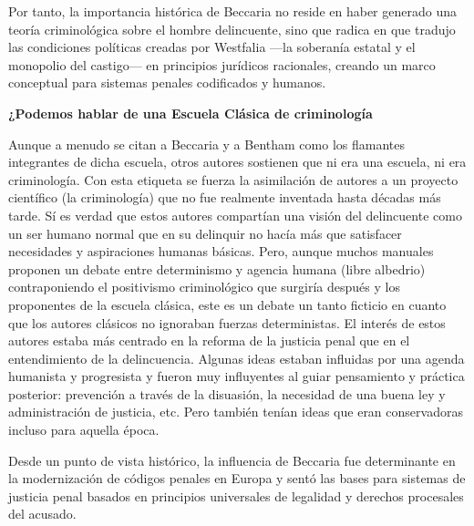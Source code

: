 \documentclass[
  spanish,
  letterpaper,
  DIV=11,
  numbers=noendperiod]{scrreprt}
\begin{document}
Por tanto, la importancia histórica de Beccaria no reside en haber
generado una teoría criminológica sobre el hombre delincuente, sino que
radica en que tradujo las condiciones políticas creadas por Westfalia
---la soberanía estatal y el monopolio del castigo--- en principios
jurídicos racionales, creando un marco conceptual para sistemas penales
codificados y humanos.

\begin{tcolorbox}[enhanced jigsaw, bottomtitle=1mm, toprule=.15mm, colbacktitle=quarto-callout-note-color!10!white, bottomrule=.15mm, leftrule=.75mm, colframe=quarto-callout-note-color-frame, opacitybacktitle=0.6, titlerule=0mm, breakable, colback=white, left=2mm, arc=.35mm, title=\textcolor{quarto-callout-note-color}{\faInfo}\hspace{0.5em}{Nota}, toptitle=1mm, coltitle=black, rightrule=.15mm, opacityback=0]

\textbf{¿Podemos hablar de una Escuela Clásica de criminología}

Aunque a menudo se citan a Beccaria y a Bentham como los flamantes
integrantes de dicha escuela, otros autores sostienen que ni era una
escuela, ni era criminología. Con esta etiqueta se fuerza la asimilación
de autores a un proyecto científico (la criminología) que no fue
realmente inventada hasta décadas más tarde. Sí es verdad que estos
autores compartían una visión del delincuente como un ser humano normal
que en su delinquir no hacía más que satisfacer necesidades y
aspiraciones humanas básicas. Pero, aunque muchos manuales proponen un
debate entre determinismo y agencia humana (libre albedrio)
contraponiendo el positivismo criminológico que surgiría después y los
proponentes de la escuela clásica, este es un debate un tanto ficticio
en cuanto que los autores clásicos no ignoraban fuerzas deterministas.
El interés de estos autores estaba más centrado en la reforma de la
justicia penal que en el entendimiento de la delincuencia. Algunas ideas
estaban influidas por una agenda humanista y progresista y fueron muy
influyentes al guiar pensamiento y práctica posterior: prevención a
través de la disuasión, la necesidad de una buena ley y administración
de justicia, etc. Pero también tenían ideas que eran conservadoras
incluso para aquella época.

\end{tcolorbox}

Desde un punto de vista histórico, la influencia de Beccaria fue
determinante en la modernización de códigos penales en Europa y sentó
las bases para sistemas de justicia penal basados en principios
universales de legalidad y derechos procesales del acusado.
\end{document}
